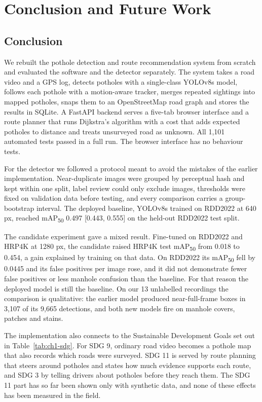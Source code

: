 \chapter{Conclusion and Future Work}\label{ch:conclusion}

\section{Conclusion}
We rebuilt the pothole detection and route recommendation system from scratch and evaluated the software and the detector separately. The system takes a road video and a GPS log, detects potholes with a single-class YOLOv8s model, follows each pothole with a motion-aware tracker, merges repeated sightings into mapped potholes, snaps them to an OpenStreetMap road graph and stores the results in SQLite. A FastAPI backend serves a five-tab browser interface and a route planner that runs Dijkstra's algorithm with a cost that adds expected potholes to distance and treats unsurveyed road as unknown. All 1,101 automated tests passed in a full run. The browser interface has no behaviour tests.

For the detector we followed a protocol meant to avoid the mistakes of the earlier implementation. Near-duplicate images were grouped by perceptual hash and kept within one split, label review could only exclude images, thresholds were fixed on validation data before testing, and every comparison carries a group-bootstrap interval. The deployed baseline, YOLOv8s trained on RDD2022 at 640 px, reached mAP\textsubscript{50} 0.497 [0.443, 0.555] on the held-out RDD2022 test split.

The candidate experiment gave a mixed result. Fine-tuned on RDD2022 and HRP4K at 1280 px, the candidate raised HRP4K test mAP\textsubscript{50} from 0.018 to 0.454, a gain explained by training on that data. On RDD2022 its mAP\textsubscript{50} fell by 0.0445 and its false positives per image rose, and it did not demonstrate fewer false positives or less manhole confusion than the baseline. For that reason the deployed model is still the baseline. On our 13 unlabelled recordings the comparison is qualitative: the earlier model produced near-full-frame boxes in 3,107 of its 9,665 detections, and both new models fire on manhole covers, patches and stains.

The implementation also connects to the Sustainable Development Goals set out in Table~\ref{tab:ch1-sdg}. For SDG 9, ordinary road video becomes a pothole map that also records which roads were surveyed. SDG 11 is served by route planning that steers around potholes and states how much evidence supports each route, and SDG 3 by telling drivers about potholes before they reach them. The SDG 11 part has so far been shown only with synthetic data, and none of these effects has been measured in the field.

